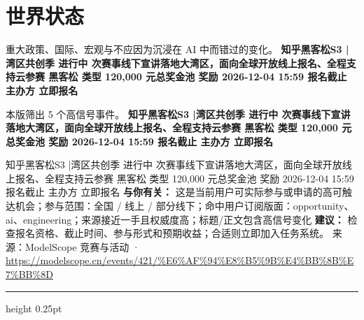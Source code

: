 \documentclass[10.5pt]{ctexart}
\begin{document}
\section*{世界状态}
{\color{ormuted} 重大政策、国际、宏观与不应因为沉浸在 AI 中而错过的变化。}
\vspace{2mm}
{\LARGE\bfseries 知乎黑客松S3 |湾区共创季 进行中 次赛事线下宣讲落地大湾区，面向全球开放线上报名、全程支持云参赛 黑客松 类型 120,000 元总奖金池 奖励 2026-12-04 15:59 报名截止 主办方 立即报名}\par
\vspace{1mm}
{\color{ormuted} 本版筛出 5 个高信号事件。}
\vspace{3mm}
{\Large\bfseries 知乎黑客松S3 |湾区共创季 进行中 次赛事线下宣讲落地大湾区，面向全球开放线上报名、全程支持云参赛 黑客松 类型 120,000 元总奖金池 奖励 2026-12-04 15:59 报名截止 主办方 立即报名}\par
知乎黑客松S3 |湾区共创季 进行中 次赛事线下宣讲落地大湾区，面向全球开放线上报名、全程支持云参赛 黑客松 类型 120,000 元总奖金池 奖励 2026-12-04 15:59 报名截止 主办方 立即报名
\textbf{与你有关：} 这是当前用户可实际参与或申请的高可触达机会；参与范围：全国 / 线上 / 部分线下；命中用户订阅版面：opportunity、ai、engineering；来源接近一手且权威度高；标题/正文包含高信号变化
\textbf{建议：} 检查报名资格、截止时间、参与形式和预期收益；合适则立即加入任务系统。
{\footnotesize\color{ormuted} 来源：ModelScope 竞赛与活动 · \url{https://modelscope.cn/events/421/%E6%AF%94%E8%B5%9B%E4%BB%8B%E7%BB%8D}}
\vspace{4mm}
\hrule height 0.25pt
\vspace{3mm}
\end{document}
